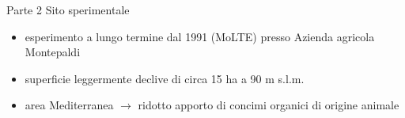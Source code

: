 \documentclass[10pt]{beamer}
\begin{document}
\begin{frame}{Parte 2 \small{Sito sperimentale}}
\begin{minipage}[0.45\textheight]{\textwidth}
\begin{itemize}[<+->]
\item esperimento a lungo termine dal 1991 (MoLTE) presso Azienda
  agricola Montepaldi
\item superficie leggermente declive di circa 15 ha a 90
  m s.l.m.
\item area Mediterranea $\rightarrow$ ridotto apporto di concimi
  organici di origine animale
\end{itemize}
\end{minipage}
\vfill
\begin{minipage}[0.45\textheight]{\textwidth}

\end{minipage}
\end{frame}
\end{document}
